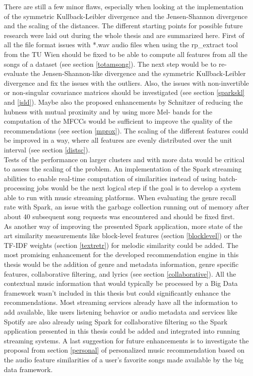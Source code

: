 There are still a few minor flaws, especially when looking at the implementation of the symmetric Kullback-Leibler divergence and the Jensen-Shannon divergence and the scaling of the distances. The different starting points for possible future research were laid out during the whole thesis and are summarized here. First of all the file format issues with *.wav audio files when using the rp\_extract tool from the TU Wien should be fixed to be able to compute all features from all the songs of a dataset (see section \ref{totamsong}).
The next step would be to re-evaluate the Jensen-Shannon-like divergence and the symmetric Kullback-Leibler divergence and fix the issues with the outliers. Also, the issues with non-invertible or non-singular covariance matrices should be investigated (see section \ref{sparkskl} and \ref{jsld}). Maybe also the proposed enhancements by Schnitzer \cite{schnitzer1} of reducing the hubness with mutual proximity and by using more Mel- bands for the computation of the MFCCs would be sufficient to improve the quality of the recommendations (see section \ref{mprox}). The scaling of the different features could be improved in a way, where all features are evenly distributed over the unit interval (see section \ref{distsc}).\\
Tests of the performance on larger clusters and with more data would be critical to assess the scaling of the problem.
An implementation of the Spark streaming abilities to enable real-time computation of similarities instead of using batch-processing jobs would be the next logical step if the goal is to develop a system able to run with music streaming platforms. When evaluating the genre recall rate with Spark, an issue with the garbage collection running out of memory after about 40 subsequent song requests was encountered and should be fixed first.\\
\noindent As another way of improving the presented Spark application, more state of the art similarity measurements like block-level features (section \ref{blocklevel}) or the TF-IDF weights (section \ref{textretr}) for melodic similarity could be added. The most promising enhancement for the developed recommendation engine in this thesis would be the addition of genre and metadata information, genre specific features, collaborative filtering, and lyrics (see section \ref{collaborative}). All the contextual music information that would typically be processed by a Big Data framework wasn't included in this thesis but could significantly enhance the recommendations. Most streaming services already have all the information to add available, like users listening behavior or audio metadata and services like Spotify are also already using Spark for collaborative filtering so the Spark application presented in this thesis could be added and integrated into running streaming systems. A last suggestion for future enhancements is to investigate the proposal from section \ref{personal} of personalized music recommendation based on the audio feature similarities of a user's favorite songs made available by the big data framework.

